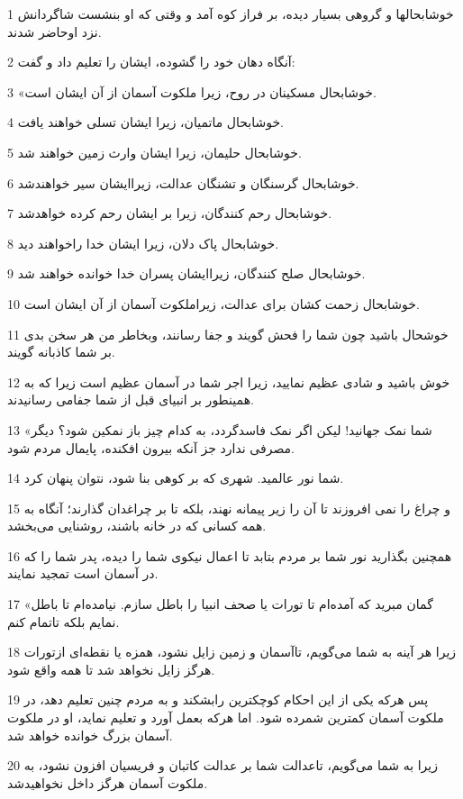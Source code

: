 \par 1 خوشابحالها و گروهی بسیار دیده، بر فراز کوه آمد و وقتی که او بنشست شاگردانش نزد اوحاضر شدند.
\par 2 آنگاه دهان خود را گشوده، ایشان را تعلیم داد و گفت:
\par 3 «خوشابحال مسکینان در روح، زیرا ملکوت آسمان از آن ایشان است.
\par 4 خوشابحال ماتمیان، زیرا ایشان تسلی خواهند یافت.
\par 5 خوشابحال حلیمان، زیرا ایشان وارث زمین خواهند شد.
\par 6 خوشابحال گرسنگان و تشنگان عدالت، زیراایشان سیر خواهندشد.
\par 7 خوشابحال رحم کنندگان، زیرا بر ایشان رحم کرده خواهدشد.
\par 8 خوشابحال پاک دلان، زیرا ایشان خدا راخواهند دید.
\par 9 خوشابحال صلح کنندگان، زیراایشان پسران خدا خوانده خواهند شد.
\par 10 خوشابحال زحمت کشان برای عدالت، زیراملکوت آسمان از آن ایشان است.
\par 11 خوشحال باشید چون شما را فحش گویند و جفا رسانند، وبخاطر من هر سخن بدی بر شما کاذبانه گویند.
\par 12 خوش باشید و شادی عظیم نمایید، زیرا اجر شما در آسمان عظیم است زیرا که به همینطور بر انبیای قبل از شما جفامی رسانیدند.
\par 13 «شما نمک جهانید! لیکن اگر نمک فاسدگردد، به کدام چیز باز نمکین شود؟ دیگر مصرفی ندارد جز آنکه بیرون افکنده، پایمال مردم شود.
\par 14 شما نور عالمید. شهری که بر کوهی بنا شود، نتوان پنهان کرد.
\par 15 و چراغ را نمی افروزند تا آن را زیر پیمانه نهند، بلکه تا بر چراغدان گذارند؛ آنگاه به همه کسانی که در خانه باشند، روشنایی می‌بخشد.
\par 16 همچنین بگذارید نور شما بر مردم بتابد تا اعمال نیکوی شما را دیده، پدر شما را که در آسمان است تمجید نمایند.
\par 17 «گمان مبرید که آمده‌ام تا تورات یا صحف انبیا را باطل سازم. نیامده‌ام تا باطل نمایم بلکه تاتمام کنم.
\par 18 زیرا هر آینه به شما می‌گویم، تاآسمان و زمین زایل نشود، همزه یا نقطه‌ای ازتورات هرگز زایل نخواهد شد تا همه واقع شود.
\par 19 پس هر‌که یکی از این احکام کوچکترین رابشکند و به مردم چنین تعلیم دهد، در ملکوت آسمان کمترین شمرده شود. اما هر‌که بعمل آورد و تعلیم نماید، او در ملکوت آسمان بزرگ خوانده خواهد شد.
\par 20 زیرا به شما می‌گویم، تاعدالت شما بر عدالت کاتبان و فریسیان افزون نشود، به ملکوت آسمان هرگز داخل نخواهیدشد.
